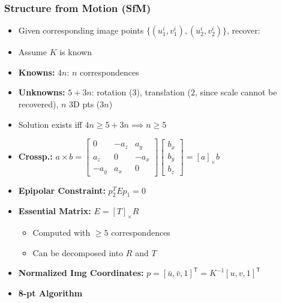 \documentclass[a4paper]{article}
\newcommand{\ides}[1]{\item \textbf{#1}}
\newcommand{\transpose}{\mathsf{T}}
\begin{document}
\subsubsection{Structure from Motion (SfM)}
\begin{itemize}
    \item Given corresponding image points $\{(u_1^i, v_1^i), (u_2^i, v_2^i)\}$, recover:
    \item Assume $K$ is known
    \ides{Knowns:} $4n$: $n$ correspondences
    \ides{Unknowns:} $5 + 3n$: rotation ($3$), translation ($2$, since scale cannot be recovered), $n$ 3D pts ($3n$)
    \item Solution exists iff $4n \ge 5 + 3n \implies n \ge 5$
    \ides{Crossp.:} $a \times b =
        \begin{bmatrix}
            0 & -a_z & a_y\\
            a_z & 0 & -a_x\\
            -a_y & a_x & 0
        \end{bmatrix}
        \begin{bmatrix}
            b_x\\
            b_y\\
            b_z
        \end{bmatrix} = [a]_\times b$
    \ides{Epipolar Constraint:} $p_2^T E p_1 = 0$
    \ides{Essential Matrix:} $E = [T]_\times R$
        \begin{itemize}
            \item Computed with $\ge 5$ correspondences
            \item Can be decomposed into $R$ and $T$
        \end{itemize}
    \ides{Normalized Img Coordinates:} $p = [\bar u, \bar v, 1]^\transpose = K^{-1}[u, v, 1]^\transpose$
    \ides{8-pt Algorithm}
        \begin{itemize}

\end{itemize}
\end{itemize}
\end{document}
